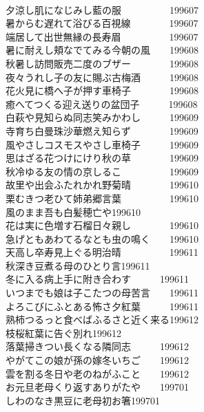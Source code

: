 \begin{multicols}{2}
\\夕涼し肌になじみし藍の服　　　　　\hfill{199607}
\\暑からむ遅れて浴びる百視線　　　　\hfill{199607}
\\端居して出世無縁の長寿眉　　　　　\hfill{199607}
\\暑に耐えし頬なでてみる今朝の風　　\hfill{199608}
\\秋暑し訪問販売二度のブザー　　　　\hfill{199608}
\\夜々うれし子の友に賜ぶ古梅酒　　　\hfill{199608}
\\花火見に橋へ子が押す車椅子　　　　\hfill{199608}
\\癒へてつくる迎え送りの盆団子　　　\hfill{199608}
\\白萩や見知らぬ同志笑みかわし　　　\hfill{199609}
\\寺育ち白曼珠沙華燃え知らず　　　　\hfill{199609}
\\風やさしコスモスやさし車椅子　　　\hfill{199609}
\\思はざる花つけにけり秋の草　　　　\hfill{199609}
\\秋冷ゆる友の情の京しるこ　　　　　\hfill{199609}
\\故里や出会ふたれかれ野菊晴　　　　\hfill{199610}
\\栗むきつ老ひて姉弟郷言葉　　　　　\hfill{199610}
\\風のまま吾も白髪穂亡や\hfill{199610}
\\花は実に色増す石榴日々親し　　　　\hfill{199610}
\\急げともあわてるなとも虫の鳴く　　\hfill{199610}
\\天高し卒寿見上ぐる明治晴　　　　　\hfill{199611}
\\秋深き豆煮る母のひとり言\hfill{199611}
\\冬に入る病上手に附き合わす　　　\hfill{199611}
\\いつまでも娘は子こたつの母苦言　　\hfill{199611}
\\よろこびにふとある怖さ夕紅葉　　　\hfill{199611}
\\熟柿つるっと食べばふるさと近く来る\hfill{199612}
\\枝桜紅葉に告ぐ別れ\hfill{199612}
\\落葉掃きつい長くなる隣同志　　　\hfill{199612}
\\やがてこの娘が孫の嫁冬いちご　　\hfill{199612}
\\雲を割る冬日や老のねがふこと　　\hfill{199612}
\\お元旦老母くり返すありがたや　　\hfill{199701}
\\しわのなき黒豆に老母初お箸\hfill{199701}

\end{multicols}
